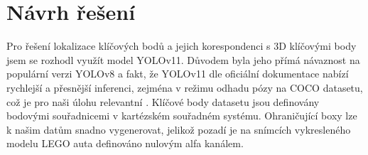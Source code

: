 \chapter{Návrh řešení}
\label{sec:Chapter4}
Pro řešení lokalizace klíčových bodů a jejich korespondenci s 3D klíčovými body jsem se rozhodl využít model YOLOv11. Důvodem byla jeho přímá návaznost na populární verzi YOLOv8 a fakt, že YOLOv11 dle oficiální dokumentace nabízí rychlejší a přesnější inferenci, zejména v režimu odhadu pózy na COCO datasetu, což je pro naši úlohu relevantní \cite{ultralytics_yolov8_vs_yolo11}. Klíčové body datasetu jsou definovány bodovými souřadnicemi v kartézském souřadném systému. Ohraničující boxy lze k našim datům snadno vygenerovat, jelikož pozadí je na snímcích vykresleného modelu LEGO auta definováno nulovým alfa kanálem.